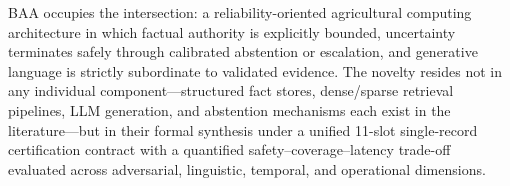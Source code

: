 BAA occupies the intersection: a reliability-oriented agricultural computing architecture in which factual authority is explicitly bounded, uncertainty terminates safely through calibrated abstention or escalation, and generative language is strictly subordinate to validated evidence. The novelty resides not in any individual component---structured fact stores, dense/sparse retrieval pipelines, LLM generation, and abstention mechanisms each exist in the literature---but in their formal synthesis under a unified 11-slot single-record certification contract with a quantified safety--coverage--latency trade-off evaluated across adversarial, linguistic, temporal, and operational dimensions.